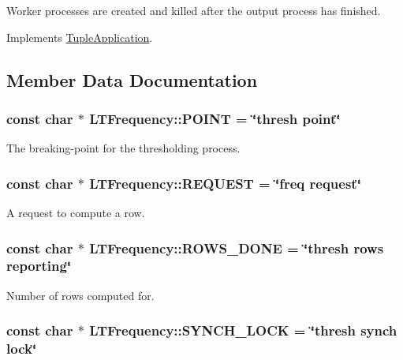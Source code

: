 Worker processes are created and killed after the output process has finished. 

Implements \hyperlink{class_tuple_application_ef6ae8bb1d697e4ed038b43320183c89}{TupleApplication}.

\subsection{Member Data Documentation}
\hypertarget{class_l_t_frequency_731ba0c5b44e4ffa55496bceb2bd6578}{
\subsubsection[{POINT}]{\setlength{\rightskip}{0pt plus 5cm}const char $\ast$ {\bf LTFrequency::POINT} = \char`\"{}thresh point\char`\"{}}}
\label{class_l_t_frequency_731ba0c5b44e4ffa55496bceb2bd6578}


The breaking-point for the thresholding process. \hypertarget{class_l_t_frequency_f2db2bc6c1837dff0fa90a88a2290d62}{
\subsubsection[{REQUEST}]{\setlength{\rightskip}{0pt plus 5cm}const char $\ast$ {\bf LTFrequency::REQUEST} = \char`\"{}freq request\char`\"{}}}
\label{class_l_t_frequency_f2db2bc6c1837dff0fa90a88a2290d62}


A request to compute a row. \hypertarget{class_l_t_frequency_db43dba3f48655d75150da76ff2a6a88}{
\subsubsection[{ROWS\_\-DONE}]{\setlength{\rightskip}{0pt plus 5cm}const char $\ast$ {\bf LTFrequency::ROWS\_\-DONE} = \char`\"{}thresh rows reporting\char`\"{}}}
\label{class_l_t_frequency_db43dba3f48655d75150da76ff2a6a88}


Number of rows computed for. \hypertarget{class_l_t_frequency_805150bf6fcc824bac1fcbb14914ecd4}{
\subsubsection[{SYNCH\_\-LOCK}]{\setlength{\rightskip}{0pt plus 5cm}const char $\ast$ {\bf LTFrequency::SYNCH\_\-LOCK} = \char`\"{}thresh synch lock\char`\"{}}}
\label{class_l_t_frequency_805150bf6fcc824bac1fcbb14914ecd4}


